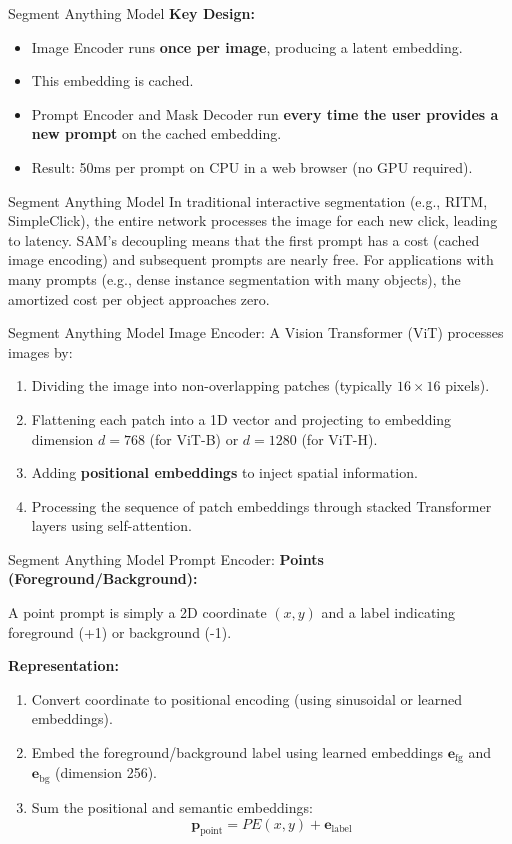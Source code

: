 \documentclass[11pt, aspectratio=169]{beamer}
\begin{document}
\begin{frame}{Segment Anything Model}
	\textbf{Key Design:}
	\begin{itemize}
		\item Image Encoder runs \textbf{once per image}, producing a latent embedding.
		\item This embedding is cached.
		\item Prompt Encoder and Mask Decoder run \textbf{every time the user provides a new prompt} on the cached embedding.
		\item Result: 50ms per prompt on CPU in a web browser (no GPU required).
	\end{itemize}
\end{frame}

\begin{frame}{Segment Anything Model}
	In traditional interactive segmentation (e.g., RITM, SimpleClick), the entire network processes the image for each new click, leading to latency. SAM's decoupling means that the first prompt has a cost (cached image encoding) and subsequent prompts are nearly free. For applications with many prompts (e.g., dense instance segmentation with many objects), the amortized cost per object approaches zero.
\end{frame}

\begin{frame}{Segment Anything Model}
	Image Encoder: A Vision Transformer (ViT) processes images by:
	\begin{enumerate}
		\item Dividing the image into non-overlapping patches (typically $16 \times 16$ pixels).
		\item Flattening each patch into a 1D vector and projecting to embedding dimension $d = 768$ (for ViT-B) or $d = 1280$ (for ViT-H).
		\item Adding \textbf{positional embeddings} to inject spatial information.
		\item Processing the sequence of patch embeddings through stacked Transformer layers using self-attention.
	\end{enumerate}
\end{frame}

\begin{frame}{Segment Anything Model}
	Prompt Encoder:
	\textbf{Points (Foreground/Background):}
	
	A point prompt is simply a 2D coordinate $(x, y)$ and a label indicating foreground (+1) or background (-1).
	
	\textbf{Representation:}
	\begin{enumerate}
		\item Convert coordinate to positional encoding (using sinusoidal or learned embeddings).
		\item Embed the foreground/background label using learned embeddings $\mathbf{e}_{\text{fg}}$ and $\mathbf{e}_{\text{bg}}$ (dimension 256).
		\item Sum the positional and semantic embeddings:
		\[ \mathbf{p}_{\text{point}} = PE(x, y) + \mathbf{e}_{\text{label}} \]
	\end{enumerate}
\end{frame}
\end{document}
